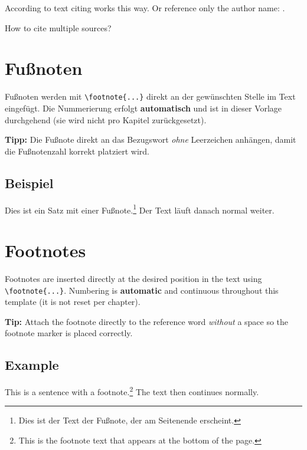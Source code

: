   According to \textcite[p. 3]{DAgostino.2021} text citing works this way.
  Or reference only the author name: \citeauthor{Kritzinger.2018}.

  How to cite multiple sources? \parencites[p. 3]{Borrmann.2018}[p. 4]{Kritzinger.2018}
\fi


\ifnum{}
  \section{Fußnoten}
  Fußnoten werden mit \verb|\footnote{...}| direkt an der gewünschten Stelle im Text eingefügt. Die Nummerierung erfolgt \textbf{automatisch} und ist in dieser Vorlage durchgehend (sie wird nicht pro Kapitel zurückgesetzt).

  \textbf{Tipp:} Die Fußnote direkt an das Bezugswort \emph{ohne} Leerzeichen anhängen, damit die Fußnotenzahl korrekt platziert wird.

  \subsection{Beispiel}
  Dies ist ein Satz mit einer Fußnote.\footnote{Dies ist der Text der Fußnote, der am Seitenende erscheint.} Der Text läuft danach normal weiter.

\else
  \section{Footnotes}
  Footnotes are inserted directly at the desired position in the text using \verb|\footnote{...}|. Numbering is \textbf{automatic} and continuous throughout this template (it is not reset per chapter).

  \textbf{Tip:} Attach the footnote directly to the reference word \emph{without} a space so the footnote marker is placed correctly.

  \subsection{Example}
  This is a sentence with a footnote.\footnote{This is the footnote text that appears at the bottom of the page.} The text then continues normally.
\fi


\ifnum{}
